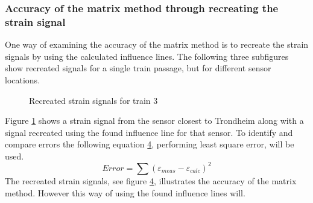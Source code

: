 \subsubsection{Accuracy of the matrix method through recreating the strain signal}
One way of examining the accuracy of the matrix method is to recreate the strain signals by using the calculated influence lines. The following three subfigures show recreated signals for a single train passage, but for different sensor locations.
\begin{figure}[H]
\begin{subfigure}[t]{0.9\textwidth}
\centering

\label{recreated_sensor_trond_train3}
\end{subfigure}

\begin{subfigure}[t]{0.9\textwidth}
\centering

\label{recreated_sensor_middle_train3}
\end{subfigure}

\begin{subfigure}[t]{0.9\textwidth}
\centering

\label{recreated_sensor_heimdal_train3}
\end{subfigure}

\caption{Recreated strain signals for train 3}
\label{fig:recreated_strains}
\end{figure}
Figure \ref{recreated_sensor_trond_train3} shows a strain signal from the sensor closest to Trondheim along with a signal recreated using the found influence line for that sensor. To identify and compare errors the following equation \ref{fig:recreated_strains}, performing least square error, will be used.
\begin{equation}
	Error = \sum{ (\varepsilon_{meas} - \varepsilon_{calc})^2}
\end{equation}
The recreated strain signals, see figure \ref{fig:recreated_strains}, illustrates the accuracy of the matrix method. However this way of using the found influence lines will.
